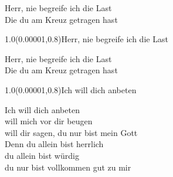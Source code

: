 \documentclass[aspectratio=169]{beamer}
\begin{document}
\begin{frame}
\centering
\color{white}
\huge{Herr, nie begreife ich die Last} \\
\huge{Die du am Kreuz getragen hast} \\

\begin{textblock}{1.0}(0.00001,0.8)\color{gray}\normalsize{Herr, nie begreife ich die Last}\end{textblock}
\end{frame}

\begin{frame}
\centering
\color{white}
\huge{Herr, nie begreife ich die Last} \\
\huge{Die du am Kreuz getragen hast} \\

\begin{textblock}{1.0}(0.00001,0.8)\color{gray}\normalsize{Ich will dich anbeten}\end{textblock}
\end{frame}

\begin{frame}
\centering
\color{white}
\huge{Ich will dich anbeten} \\
\huge{will mich vor dir beugen} \\
\huge{will dir sagen, du nur bist mein Gott} \\
\huge{Denn du allein bist herrlich} \\
\huge{du allein bist würdig} \\
\huge{du nur bist vollkommen gut zu mir} \\
\end{frame}
\end{document}
